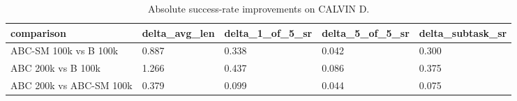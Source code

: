 \begin{table}[t]
\centering
\caption{Absolute success-rate improvements on CALVIN D.}
\label{tab:task3-success-rate-improvements}
\begin{tabular}{lllll}
\toprule
comparison & delta\_avg\_len & delta\_1\_of\_5\_sr & delta\_5\_of\_5\_sr & delta\_subtask\_sr \\
\midrule
ABC-SM 100k vs B 100k & 0.887 & 0.338 & 0.042 & 0.300 \\
ABC 200k vs B 100k & 1.266 & 0.437 & 0.086 & 0.375 \\
ABC 200k vs ABC-SM 100k & 0.379 & 0.099 & 0.044 & 0.075 \\
\bottomrule
\end{tabular}
\end{table}
